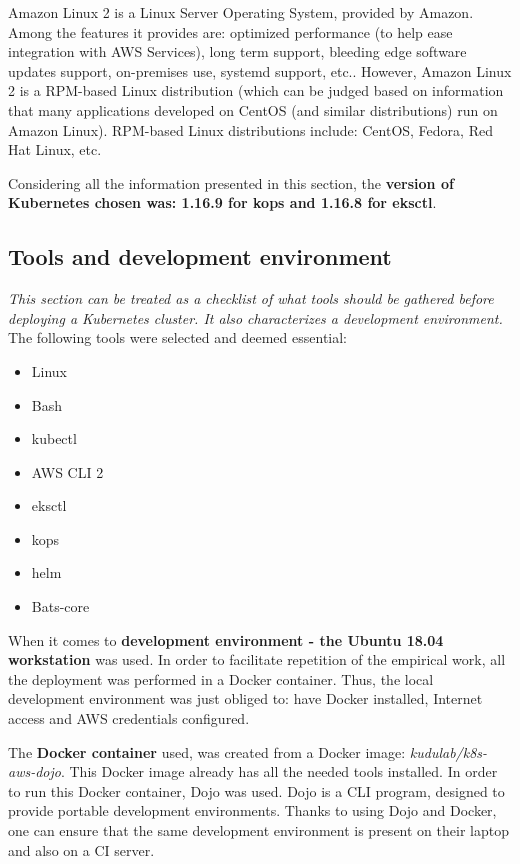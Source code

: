 Amazon Linux 2 is a Linux Server Operating System, provided by Amazon. Among the features it provides are: optimized performance (to help ease integration with AWS Services), long term support, bleeding edge software updates support, on-premises use, systemd support, etc.\cite{al2}. However, Amazon Linux 2 is a RPM-based Linux distribution (which can be judged based on information that many applications developed on CentOS (and similar distributions) run on Amazon Linux)\cite{al2-centos}. RPM-based Linux distributions include: CentOS, Fedora, Red Hat Linux, etc.

Considering all the information presented in this section, the \textbf{version of Kubernetes chosen was: 1.16.9 for kops and 1.16.8 for eksctl}.


\subsection{Tools and development environment}
\label{tools}
\textit{This section can be treated as a checklist of what tools should be gathered before deploying a Kubernetes cluster. It also characterizes a development environment.}
\\

The following tools were selected and deemed essential:
\begin{itemize}
\item Linux
\item Bash
\item kubectl
\item AWS CLI 2
\item eksctl
\item kops
\item helm
\item Bats-core
\end{itemize}

When it comes to \textbf{development environment - the Ubuntu 18.04 workstation} was used. In order to facilitate repetition of the empirical work, all the deployment was performed in a Docker container. Thus, the local development environment was just obliged to: have Docker installed, Internet access and AWS credentials configured.

The \textbf{Docker container} used, was created from a Docker image: \textit{kudulab/k8s-aws-dojo}\cite{gh-k8s-aws-dojo}. This Docker image already has all the needed tools installed. In order to run this Docker container, Dojo was used. Dojo is a CLI program, designed to provide portable development environments\cite{gh-dojo}. Thanks to using Dojo and Docker, one can ensure that the same development environment is present on their laptop and also on a CI server.

